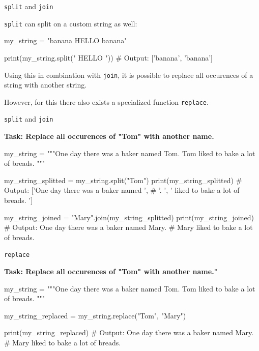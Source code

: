 \begin{frame}[fragile]{\texttt{split} and \texttt{join}}

    \texttt{split} can split on a custom string as well:

    \begin{pythoncode}

my_string = "banana HELLO banana"

print(my_string.split(" HELLO "))
# Output: ['banana', 'banana']
    
    \end{pythoncode}

    Using this in combination with \texttt{join}, it is possible to replace all occurences of a string with another string. 

    \vspace{1em}

    However, for this there also exists a specialized function \texttt{replace}.
    

\end{frame}

\begin{frame}[fragile]{\texttt{split} and \texttt{join}}

    \textbf{Task: Replace all occurences of "Tom" with another name.}

    \begin{pythoncode}

my_string = """One day there was a baker named Tom. 
Tom liked to bake a lot of breads. """

my_string_splitted = my_string.split("Tom")
print(my_string_splitted)
# Output: ['One day there was a baker named ', 
# '. \n', ' liked to bake a lot of breads. ']

my_string_joined = "Mary".join(my_string_splitted)
print(my_string_joined)
# Output: One day there was a baker named Mary. 
# Mary liked to bake a lot of breads.

    \end{pythoncode}


\end{frame}

\begin{frame}[fragile]{\texttt{replace}}

    \textbf{Task: Replace all occurences of "Tom" with another name."}

    \begin{pythoncode}

my_string = """One day there was a baker named Tom. 
Tom liked to bake a lot of breads. """

my_string_replaced = my_string.replace("Tom", "Mary")

print(my_string_replaced)
# Output: One day there was a baker named Mary. 
# Mary liked to bake a lot of breads.

    \end{pythoncode}

\end{frame}

